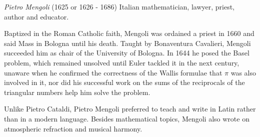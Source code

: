 \documentclass[12pt]{article}
\begin{document}
\emph{Pietro Mengoli} (1625 or 1626 - 1686) Italian mathematician, lawyer, priest, author and educator.

Baptized in the Roman Catholic faith, Mengoli was ordained a priest in 1660 and said Mass in Bologna until his death. Taught by Bonaventura Cavalieri, Mengoli succeeded him as chair of the University of Bologna. In 1644 he posed the Basel problem, which remained unsolved until Euler tackled it in the next century, unaware when he confirmed the correctness of the Wallis formulae that $\pi$ was also involved in it, nor did his successful work on the sums of the reciprocals of the triangular numbers help him solve the problem.

Unlike Pietro Cataldi, Pietro Mengoli preferred to teach and write in Latin rather than in a modern language. Besides mathematical topics, Mengoli also wrote on atmospheric refraction and musical harmony.
\end{document}
